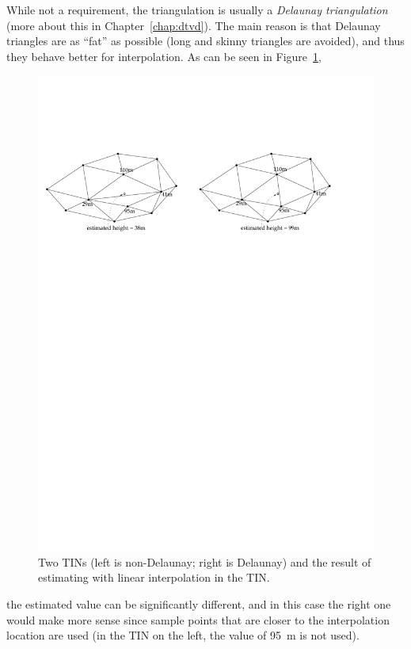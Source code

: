 While not a requirement, the triangulation is usually a \emph{Delaunay triangulation} (more about this in Chapter~\ref{chap:dtvd}).%
The main reason is that Delaunay triangles are as ``fat'' as possible (long and skinny triangles are avoided), and thus they behave better for interpolation.
As can be seen in Figure~\ref{fig:whydt},
\begin{figure}
  \centering
  \includegraphics[width=\linewidth]{figs/whydt}
  \caption{Two TINs (left is non-Delaunay; right is Delaunay) and the result of estimating with linear interpolation in the TIN\@.}%
\label{fig:whydt}
\end{figure}
the estimated value can be significantly different, and in this case the right one would make more sense since sample points that are closer to the interpolation location are used (in the TIN on the left, the value of \qty{95}{\m} is not used).

